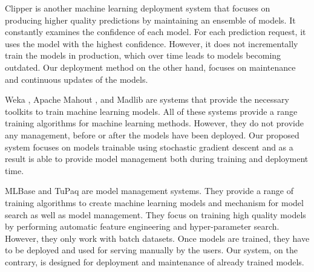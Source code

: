 \documentclass{vldb}
\begin{document}
Clipper \cite{crankshaw2016clipper} is another machine learning deployment system that focuses on producing higher quality predictions by maintaining an ensemble of models.
It constantly examines the confidence of each model.
For each prediction request, it uses the model with the highest confidence.
However, it does not incrementally train the models in production, which over time leads to models becoming outdated.
Our deployment method on the other hand, focuses on maintenance and continuous updates of the models.

Weka \cite{hall2009weka}, Apache Mahout \cite{Owen:2011:MA:2132656}, and Madlib \cite{hellerstein2012madlib} are systems that provide the necessary toolkits to train machine learning models. 
All of these systems provide a range training algorithms for machine learning methods. 
However, they do not provide any management, before or after the models have been deployed. 
Our proposed system focuses on models trainable using stochastic gradient descent and as a result is able to provide model management both during training and deployment time.

MLBase \cite{kraska2013mlbase} and TuPaq \cite{sparks2015tupaq} are model management systems.
They provide a range of training algorithms to create machine learning models and mechanism for model search as well as model management.
They focus on training high quality models by performing automatic feature engineering and hyper-parameter search.
However, they only work with batch datasets.
Once models are trained, they have to be deployed and used for serving manually by the users.
Our system, on the contrary, is designed for deployment and maintenance of already trained models.
\end{document}
